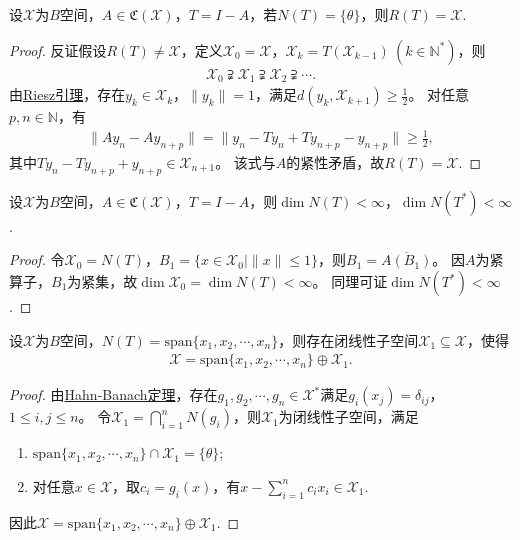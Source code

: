 \documentclass[../../main.tex]{subfiles}%
\begin{document}
\begin{theorem}\label{theorem:Fredholm定理结论1}
设$\mathscr{X}$为$B$空间，$A\in\mathfrak{C}(\mathscr{X})$，$T=I-A$，若$N(T)=\{\theta\}$，则$R(T)=\mathscr{X}$.
\end{theorem}
\begin{proof}

反证假设$R(T)\neq\mathscr{X}$，定义$\mathscr{X}_0=\mathscr{X}$，$\mathscr{X}_k=T(\mathscr{X}_{k-1})\ (k\in\mathbb{N}^*)$，则
\begin{align*}
\mathscr{X}_0\supsetneqq\mathscr{X}_1\supsetneqq\mathscr{X}_2\supsetneqq\cdots.
\end{align*}
由\hyperref[lemma:Riesz引理]{Riesz引理}，存在$y_k\in\mathscr{X}_k$，$\|y_k\|=1$，满足$d(y_k,\mathscr{X}_{k+1})\geqslant\frac{1}{2}$。
对任意$p,n\in\mathbb{N}$，有
\begin{align*}
\|Ay_n-Ay_{n+p}\|=\|y_n-Ty_n+Ty_{n+p}-y_{n+p}\|\geqslant\frac{1}{2},
\end{align*}
其中$Ty_n-Ty_{n+p}+y_{n+p}\in\mathscr{X}_{n+1}$。
该式与$A$的紧性矛盾，故$R(T)=\mathscr{X}$.

\end{proof}

\begin{lemma}
设$\mathscr{X}$为$B$空间，$A\in\mathfrak{C}(\mathscr{X})$，$T=I-A$，则$\dim N(T)<\infty$，$\dim N(T^*)<\infty$.
\end{lemma}
\begin{proof}

令$\mathscr{X}_0=N(T)$，$B_1=\{x\in\mathscr{X}_0\mid\|x\|\leqslant1\}$，则$B_1=\overline{A(B_1)}$。
因$A$为紧算子，$B_1$为紧集，故$\dim\mathscr{X}_0=\dim N(T)<\infty$。
同理可证$\dim N(T^*)<\infty$.

\end{proof}

\begin{lemma}
设$\mathscr{X}$为$B$空间，$N(T)=\mathrm{span}\{x_1,x_2,\cdots,x_n\}$，则存在闭线性子空间$\mathscr{X}_1\subseteq\mathscr{X}$，使得
\begin{align*}
\mathscr{X}=\mathrm{span}\{x_1,x_2,\cdots,x_n\}\oplus\mathscr{X}_1.
\end{align*}
\end{lemma}
\begin{proof}

由\hyperref[theorem:泛函分析--(哈恩-巴拿赫)Hahn-Banach定理]{Hahn-Banach定理}，存在$g_1,g_2,\cdots,g_n\in\mathscr{X}^*$满足$g_i(x_j)=\delta_{ij}$，$1\leqslant i,j\leqslant n$。
令$\mathscr{X}_1=\bigcap\limits_{i=1}^n N(g_i)$，则$\mathscr{X}_1$为闭线性子空间，满足
\begin{enumerate}[(1)]
\item $\mathrm{span}\{x_1,x_2,\cdots,x_n\}\cap\mathscr{X}_1=\{\theta\}$;
\item 对任意$x\in\mathscr{X}$，取$c_i=g_i(x)$，有$x-\sum\limits_{i=1}^n c_ix_i\in\mathscr{X}_1$.
\end{enumerate}
因此$\mathscr{X}=\mathrm{span}\{x_1,x_2,\cdots,x_n\}\oplus\mathscr{X}_1$.

\end{proof}
\end{document}
